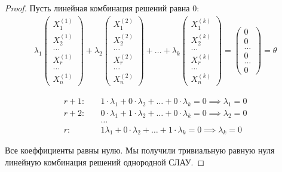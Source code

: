 \begin{proof}
  Пусть линейная комбинация решений равна 0:
  \begin{gather*}
    \lambda_1
   \begin{pmatrix}
       X^{(1)}_1 \\
       X^{(1)}_2 \\
       \ldots \\
       X^{(1)}_r \\
       \ldots \\
       X^{(1)}_n
     \end{pmatrix}
     + \lambda_2
   \begin{pmatrix}
       X^{(2)}_1 \\
       X^{(2)}_2 \\
       \ldots \\
       X^{(2)}_r \\
       \ldots \\
       X^{(2)}_n
    \end{pmatrix}
    + \ldots + \lambda_k
   \begin{pmatrix}
       X^{(k)}_1 \\
       X^{(k)}_2 \\
       \ldots \\
       X^{(k)}_r \\
       \ldots \\
       X^{(k)}_n
    \end{pmatrix}
  = 
  \begin{pmatrix}
    0 \\ 0 \\ \ldots \\ 0 \\ \ldots \\ 0
  \end{pmatrix} = \theta
  \end{gather*}
  
  \begin{align*}
    r+1: \quad &1 \cdot\lambda_1 + 0 \cdot \lambda_2 + \ldots + 0 \cdot \lambda_k = 0 \implies \lambda_1 = 0 \\
    r+2: \quad &0 \cdot\lambda_1 + 1 \cdot \lambda_2 + \ldots + 0 \cdot \lambda_k = 0 \implies \lambda_2 = 0 \\
          &\ldots \\
     r: \quad &1 \lambda_1 + 0 \cdot \lambda_2 + \ldots + 1 \cdot \lambda_k = 0 \implies \lambda_k = 0
  \end{align*}

  Все коеффициенты равны нулю. Мы получили тривиальную равную нуля линейную комбинация решений однородной СЛАУ.
\end{proof}

